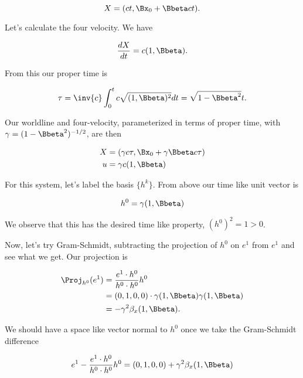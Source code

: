 \begin{equation}\label{eqn:relativisticElectrodynamicsT2:700}
X = ( ct, \Bx_0 + \Bbeta c t) .
\end{equation}

Let's calculate the four velocity.  We have

\begin{equation}\label{eqn:relativisticElectrodynamicsT2:710}
\frac{dX}{dt} = c ( 1, \Bbeta ).
\end{equation}

From this our proper time is

\begin{equation}\label{eqn:relativisticElectrodynamicsT2:720}
\tau = \inv{c} \int_0^t c \sqrt{ (1, \Bbeta)^2 } dt = \sqrt{1 - \Bbeta^2} t.
\end{equation}

Our worldline and four-velocity, parameterized in terms of proper time, with $\gamma = (1 - \Bbeta^2)^{-1/2}$, are then

\begin{align}\label{eqn:relativisticElectrodynamicsT2:730}
X &= ( \gamma c\tau, \Bx_0 + \gamma \Bbeta c \tau) \\
u &= \gamma c ( 1, \Bbeta )
\end{align}

For this system, let's label the basis $\{h^k\}$.  From above our time like unit vector is

\begin{equation}\label{eqn:relativisticElectrodynamicsT2:740}
h^0 = \gamma ( 1, \Bbeta )
\end{equation}

We observe that this has the desired time like property, $(h^0)^2 = 1 > 0$.

Now, let's try Gram-Schmidt, subtracting the projection of $h^0$ on $e^1$ from $e^1$ and see what we get.  Our projection is

\begin{align*}
\Proj_{h^0}(e^1) 
&= \frac{e^1 \cdot h^0}{h^0 \cdot h^0} h^0 \\
&= (0, 1, 0, 0) \cdot \gamma (1, \Bbeta) \gamma (1, \Bbeta) \\
&= -\gamma^2 \beta_x (1, \Bbeta).
\end{align*}

We should have a space like vector normal to $h^0$ once we take the Gram-Schmidt difference

\begin{equation}\label{eqn:relativisticElectrodynamicsT2:750}
e^1 - \frac{e^1 \cdot h^0}{h^0 \cdot h^0} h^0 =
(0, 1, 0, 0) + \gamma^2 \beta_x (1, \Bbeta)
\end{equation}

